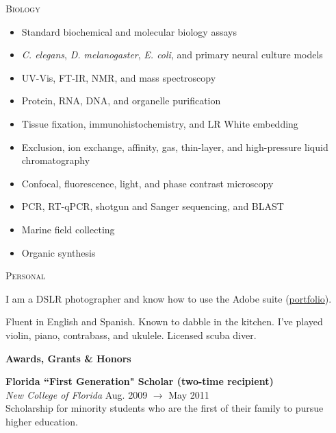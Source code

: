 \documentclass[a4paper,12pt]{article}
\newcommand{\resheading}[1]{{\vspace*{.06in} \colorbox{mygrey}{\begin{minipage}{\textwidth}{\textmd{\large \textbf{#1} \vphantom{p\^{E}}}}\end{minipage}}} }
\newcommand{\ressubheading}[4]{
        \textbf{#1} \hfill #2\\
        \textit{#3} \hfill #4 \\}
\begin{document}
     \textsc{Biology}\vspace*{-15pt}
        \begin{multicols}{2} \begin{itemize}[leftmargin=0.4cm]
        \item Standard biochemical and molecular biology assays
        \item \textit{C. elegans}, \textit{D. melanogaster}, \textit{E. coli}, and primary neural culture models
        \item UV-Vis, FT-IR, NMR, and mass spectroscopy
        \item Protein, RNA, DNA, and organelle purification
        \item Tissue fixation, immunohistochemistry, and LR White embedding
        \item Exclusion, ion exchange, affinity, gas, thin-layer, and high-pressure liquid chromatography
        \item Confocal, fluorescence, light, and phase contrast microscopy
        \item PCR, RT-qPCR, shotgun and Sanger sequencing, and BLAST
        \item Marine field collecting
        \item Organic synthesis
        \end{itemize}
        \end{multicols}
        
    \textsc{Personal}
        \begin{description}\setlength{\itemsep}{0mm}
        \item[Photography] I am a DSLR photographer and know how to use the Adobe suite (\href{https://www.flickr.com/photos/richarddecal/sets/72157640025469005/}{portfolio}).
        \item[Other] Fluent in English and Spanish. Known to dabble in the kitchen. I've played violin, piano, contrabass, and ukulele. Licensed scuba diver.
        \end{description}

        
        
\resheading{Awards, Grants \& Honors}

    \ressubheading{Florida ``First Generation" Scholar {\normalfont(two-time recipient)}}{}{New College of Florida}{Aug. 2009 $\rightarrow$ May 2011}
    Scholarship for minority students who are the first of their family to pursue higher education.\\ %
\end{document}

